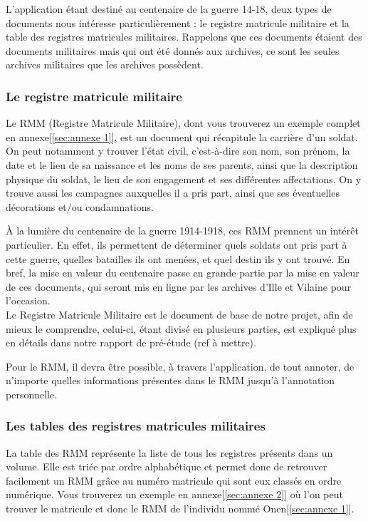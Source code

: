 \documentclass[a4paper]{article}
\begin{document}
L'application étant destiné au centenaire de la guerre 14-18, deux types de documents nous intéresse particulièrement : le registre matricule militaire et la table des registres matricules militaires. Rappelons que ces documents étaient des documents militaires mais qui ont été donnés aux archives, ce sont les seules archives militaires que les archives possèdent.

\subsubsection{Le registre matricule militaire}
Le RMM (Registre Matricule Militaire), dont vous trouverez un exemple complet en annexe[\ref{sec:annexe 1}], est un document qui récapitule la carrière d'un soldat. On peut notamment y trouver l'état civil, c'est-à-dire son nom, son prénom, la date et le lieu de sa naissance et les noms de ses parents, ainsi que la description physique du soldat, le lieu de son engagement et ses différentes affectations. On y trouve aussi les campagnes auxquelles il a pris part, ainsi que ses éventuelles décorations et/ou condamnations.

\`A la lumière du centenaire de la guerre 1914-1918, ces RMM prennent un intérêt particulier. En effet, ils permettent de déterminer quels soldats ont pris part à cette guerre, quelles batailles ils ont menées, et quel destin ils y ont trouvé. En bref, la mise en valeur du centenaire passe en grande partie par la mise en valeur de ces documents, qui seront mis en ligne par les archives d'Ille et Vilaine pour l'occasion.\\

Le Registre Matricule Militaire est le document de base de notre projet, afin de mieux le comprendre, celui-ci, étant divisé en plusieurs parties, est expliqué plus en détails dans notre rapport de pré-étude (ref à mettre).

Pour le RMM, il devra être possible, à travers l'application, de tout annoter, de n'importe quelles informations présentes dans le RMM jusqu'à l'annotation personnelle. 

\subsubsection{Les tables des registres matricules militaires}
La table des RMM représente la liste de tous les registres présents dans un volume. Elle est triée par ordre alphabétique et permet donc de retrouver facilement un RMM grâce au numéro matricule qui sont eux classés en ordre numérique. Vous trouverez un exemple en annexe[\ref{sec:annexe 2}] où l'on peut trouver le matricule et donc le RMM de l'individu nommé Onen[\ref{sec:annexe 1}].
\end{document}
